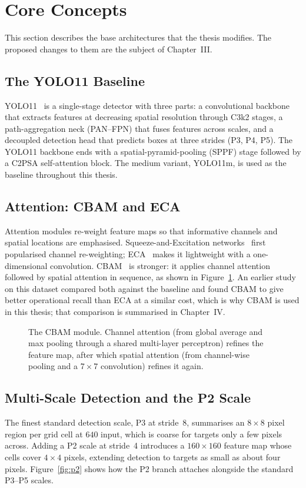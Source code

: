 \section{Core Concepts}
This section describes the base architectures that the thesis modifies. The
proposed changes to them are the subject of Chapter~III.

\subsection{The YOLO11 Baseline}
YOLO11~\cite{jocher2024yolo11} is a single-stage detector with three parts: a
convolutional backbone that extracts features at decreasing spatial resolution
through C3k2 stages, a path-aggregation neck (PAN--FPN) that fuses features across
scales, and a decoupled detection head that predicts boxes at three strides (P3,
P4, P5). The YOLO11 backbone ends with a spatial-pyramid-pooling (SPPF) stage
followed by a C2PSA self-attention block. The medium variant, YOLO11m, is used as
the baseline throughout this thesis.

\subsection{Attention: CBAM and ECA}
Attention modules re-weight feature maps so that informative channels and spatial
locations are emphasised. Squeeze-and-Excitation networks~\cite{hu2018senet} first
popularised channel re-weighting; ECA~\cite{wang2020eca} makes it lightweight with a
one-dimensional convolution. CBAM~\cite{woo2018cbam} is stronger:
it applies channel attention followed by spatial attention in sequence, as shown in
Figure~\ref{fig:cbam}. An earlier study on this dataset compared both against the
baseline and found CBAM to give better operational recall than ECA at a similar
cost, which is why CBAM is used in this thesis; that comparison is summarised in
Chapter~IV.

\begin{figure}[tbp]
  \centering
  \caption{The CBAM module. Channel attention (from global average and max pooling
  through a shared multi-layer perceptron) refines the feature map, after which
  spatial attention (from channel-wise pooling and a $7\times7$ convolution)
  refines it again.}
  \label{fig:cbam}
\end{figure}

\subsection{Multi-Scale Detection and the P2 Scale}
The finest standard detection scale, P3 at stride~8, summarises an $8\times8$ pixel
region per grid cell at $640$ input, which is coarse for targets only a few pixels
across. Adding a P2 scale at stride~4 introduces a $160\times160$ feature map whose
cells cover $4\times4$ pixels, extending detection to targets as small as about
four pixels. Figure~\ref{fig:p2} shows how the P2 branch attaches alongside the
standard P3--P5 scales.


